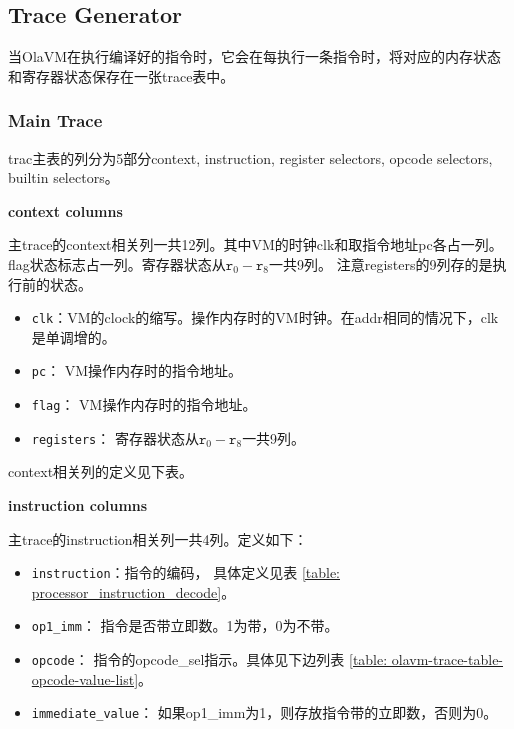 \subsection{Trace Generator}\label{subsec: : trace-generator}
当OlaVM在执行编译好的指令时，它会在每执行一条指令时，将对应的内存状态和寄存器状态保存在一张trace表中。
\subsubsection{Main Trace}\label{subsubsec: olavm-main-trace}
trac主表的列分为5部分context, instruction, register selectors, opcode selectors, builtin selectors。


\textbf{context columns}

主trace的context相关列一共12列。其中VM的时钟clk和取指令地址pc各占一列。flag状态标志占一列。寄存器状态从$\texttt{r}_0 - \texttt{r}_{8}$一共9列。
注意registers的9列存的是执行前的状态。
\begin{itemize}
    \item \verb|clk|：VM的clock的缩写。操作内存时的VM时钟。在addr相同的情况下，clk是单调增的。
    \item \verb|pc|： VM操作内存时的指令地址。
    \item \verb|flag|： VM操作内存时的指令地址。
    \item \verb|registers|： 寄存器状态从$\texttt{r}_0 - \texttt{r}_{8}$一共9列。
\end{itemize}

context相关列的定义见下表。
\begin{table}[!ht]
    \centering {}
    \caption{OlaVM的main trace表context相关列结构}
    \label{table: olavm-trace-table-context}
\end{table}

\textbf{instruction columns}

主trace的instruction相关列一共4列。定义如下：
\begin{itemize}
    \item \verb|instruction|：指令的编码， 具体定义见表 \ref{table: processor_instruction_decode}。
    \item \verb|op1_imm|： 指令是否带立即数。1为带，0为不带。
    \item \verb|opcode|：  指令的opcode\_sel指示。具体见下边列表 \ref{table: olavm-trace-table-opcode-value-list}。
    \item \verb|immediate_value|： 如果op1\_imm为1，则存放指令带的立即数，否则为0。
\end{itemize}

